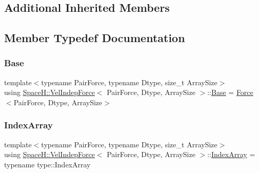 \subsection*{Additional Inherited Members}


\subsection{Member Typedef Documentation}
\mbox{\label{struct_space_h_1_1_vel_indep_force_a701c4046691703996abfd8d231a0caac}} 
\subsubsection{\texorpdfstring{Base}{Base}}
{\footnotesize\ttfamily template$<$typename Pair\+Force, typename Dtype, size\+\_\+t Array\+Size$>$ \\
using \mbox{\hyperlink{struct_space_h_1_1_vel_indep_force}{Space\+H\+::\+Vel\+Indep\+Force}}$<$ Pair\+Force, Dtype, Array\+Size $>$\+::\mbox{\hyperlink{struct_space_h_1_1_vel_indep_force_a701c4046691703996abfd8d231a0caac}{Base}} =  \mbox{\hyperlink{struct_space_h_1_1_force}{Force}}$<$Pair\+Force, Dtype, Array\+Size$>$}

\mbox{\label{struct_space_h_1_1_vel_indep_force_ac8dcda8c288da58df2f706259eeae0a9}} 
\subsubsection{\texorpdfstring{Index\+Array}{IndexArray}}
{\footnotesize\ttfamily template$<$typename Pair\+Force, typename Dtype, size\+\_\+t Array\+Size$>$ \\
using \mbox{\hyperlink{struct_space_h_1_1_vel_indep_force}{Space\+H\+::\+Vel\+Indep\+Force}}$<$ Pair\+Force, Dtype, Array\+Size $>$\+::\mbox{\hyperlink{struct_space_h_1_1_vel_indep_force_ac8dcda8c288da58df2f706259eeae0a9}{Index\+Array}} =  typename type\+::\+Index\+Array}

\mbox{\label{struct_space_h_1_1_vel_indep_force_acd8813e87e53d01f1c824fcac58b7c1e}} 
